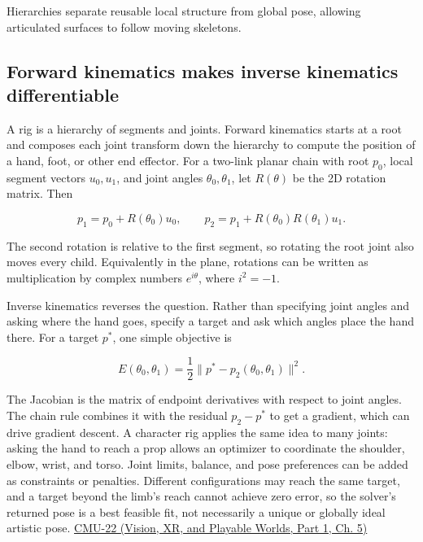 Hierarchies separate reusable local structure from global pose, allowing articulated surfaces to follow moving skeletons.

\subsection{Forward kinematics makes inverse kinematics differentiable}\label{04-visual-computing-ii-ch029-forward-kinematics-makes-inverse-kinematics-differentiable}

\hypertarget{04-visual-computing-ii-ch029-forward-kinematics-makes-inverse-kinematics-differentiable}{}

A rig is a hierarchy of segments and joints. Forward kinematics starts at a root and composes each joint transform down the hierarchy to compute the position of a hand, foot, or other end effector. For a two-link planar chain with root \(p_0\), local segment vectors \(u_0,u_1\), and joint angles \(\theta_0,\theta_1\), let \(R(\theta)\) be the 2D rotation matrix. Then

\[
p_1=p_0+R(\theta_0)u_0,\qquad
p_2=p_1+R(\theta_0)R(\theta_1)u_1.
\]

The second rotation is relative to the first segment, so rotating the root joint also moves every child. Equivalently in the plane, rotations can be written as multiplication by complex numbers \(e^{i\theta}\), where \(i^2=-1\).

Inverse kinematics reverses the question. Rather than specifying joint angles and asking where the hand goes, specify a target and ask which angles place the hand there. For a target \(p^*\), one simple objective is

\[
E(\theta_0,\theta_1)=\frac12\|p^*-p_2(\theta_0,\theta_1)\|^2.
\]

The Jacobian is the matrix of endpoint derivatives with respect to joint angles. The chain rule combines it with the residual \(p_2-p^*\) to get a gradient, which can drive gradient descent. A character rig applies the same idea to many joints: asking the hand to reach a prop allows an optimizer to coordinate the shoulder, elbow, wrist, and torso. Joint limits, balance, and pose preferences can be added as constraints or penalties. Different configurations may reach the same target, and a target beyond the limb's reach cannot achieve zero error, so the solver's returned pose is a best feasible fit, not necessarily a unique or globally ideal artistic pose. \href{../07-Vision-XR-and-Playable-Worlds-P01/main.pdf\#nameddest=04-visual-computing-ii-ch036-cmu-22---optimization}{CMU-22 (Vision, XR, and Playable Worlds, Part 1, Ch. 5)}

